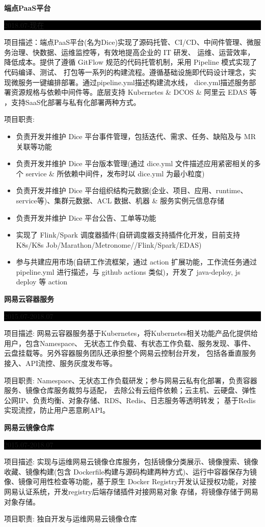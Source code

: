 \documentclass[paper=a4,fontsize=11pt]{scrartcl} %
\newcommand{\sepspace}{\vspace*{1em}}		%
\newcommand{\SubSection}[2]{
	\sepspace \noindent \textbf{#1} \hfill      %
	\colorbox{Black}{\parbox{7em}{\hfill\color{White}#2}} \par  %
	\normalsize \par \sepspace}
\begin{document}
\begin{CJK}{UTF8}{gbsn}
\SubSection{端点PaaS平台}{2018.07-现在}
项目描述：端点PaaS平台(名为Dice)实现了源码托管、CI/CD、中间件管理、微服务治理、快数据、运维监控等，有效地提高企业的 IT 研发、
运维、运营效率，降低成本。提供了遵循 GitFlow 规范的代码托管机制，采用 Pipeline 模式实现了代码编译、测试、
打包等一系列的构建流程。遵循基础设施即代码设计理念，实现微服务一键编排部署。通过pipeline.yml描述构建流水线，
dice.yml描述服务部署资源规格与依赖中间件等。底层支持 Kubernetes \& DCOS \& 阿里云 EDAS 等 ，支持SaaS化部署与私有化部署两种方式。\par
\sepspace
项目职责:  
\begin{itemize}
\item 负责开发并维护 Dice 平台事件管理，包括迭代、需求、任务、缺陷及与 MR 关联等功能
\item 负责开发并维护 Dice 平台版本管理(通过 dice.yml 文件描述应用紧密相关的多个 service \& 所依赖中间件，发布时以 dice.yml 为最小粒度)
\item 负责开发并维护 Dice 平台组织结构元数据(企业、项目、应用、runtime、service等)、集群元数据、ACL 数据、机器 \& 服务实例元信息存储
\item 负责开发并维护 Dice 平台公告、工单等功能
\item 实现了 Flink/Spark 调度器插件(自研调度器支持插件化开发，目前支持K8s/K8s Job/Marathon/Metronome//Flink/Spark/EDAS)
\item 参与共建应用市场(自研工作流框架，通过 action 扩展功能，工作流任务通过 pipeline.yml 进行描述，与 github actions 类似)，开发了 java-deploy, js deploy 等 action
\end{itemize}

\SubSection{网易云容器服务}{2015.07-2018.07}
项目描述: 网易云容器服务基于Kubernetes，将Kubernetes相关功能产品化提供给用户，包含Namespace、
无状态工作负载、有状态工作负载、服务发现、事件、云盘挂载等。另外容器服务团队还承担整个网易云控制台开发，
包括各垂直服务接入、API流控、服务灰度发布等。\par
\sepspace
项目职责: Namespace、无状态工作负载研发；参与网易云私有化部署，负责容器服务、镜像仓库服务裁剪与适配，
去除公有云组件依赖；云主机、云硬盘、弹性公网IP、负责均衡、对象存储、RDS、Redis、日志服务等透明转发；
基于Redis实现流控，防止用户恶意刷API。

\SubSection{网易云镜像仓库}{2015.07-2018.07}
项目描述: 实现与运维网易云镜像仓库服务，包括镜像分类展示、镜像搜索、镜像收藏、镜像构建(包含
Dockerfile构建与源码构建两种方式)、运行中容器保存为镜像、镜像可用性检查等功能，基于原生
Docker Registry开发认证授权功能，对接网易认证系统，开发registry后端存储插件对接网易对象
存储，将镜像存储于网易对象存储。\par
\sepspace
项目职责: 独自开发与运维网易云镜像仓库


\end{CJK}
\end{document}
